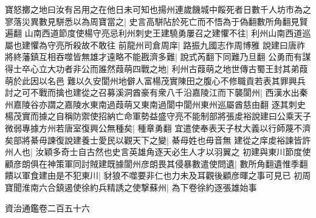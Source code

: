 寶怒擲之地曰汝有呂用之在他日未可知也揚州連歲饑城中餒死者日數千人坊市為之寥落災異數見駢悉以為周寶當之|{
	史言高駢阽於死亡而不悟為于偽翻數所角翻見賢遍翻}
山南西道節度使楊守亮忌利州刺史王建驍勇屢召之建懼不往|{
	利州山南西道巡屬也建懼為守亮所殺故不敢往}
前龍州司倉周庠|{
	路振九國志作周博雅}
說建曰唐祚將終藩鎮互相吞噬皆無雄才遠略不能戡濟多難|{
	說式芮翻下同難乃旦翻}
公勇而有謀得士卒心立大功者非公而誰然葭萌四戰之地|{
	利州古葭萌之地世傳古蜀王封其弟葭萌於此因以名邑}
難以久安閬州地僻人富楊茂實陳田之腹心不修職貢若表其罪興兵討之可不戰而擒也建從之召募溪洞酋豪有衆八千沿嘉陵江而下襲閬州|{
	西漢水出秦州嘉陵谷亦謂之嘉陵水東南過葭萌又東南過閬中閬州東州巡屬酋慈由翻}
逐其刺史楊茂實而據之自稱防禦使招納亡命軍勢益盛守亮不能制部將張䖍裕說建曰公乘天子微弱專據方州若唐室復興公無種矣|{
	種章勇翻}
宜遣使奉表天子杖大義以行師蔑不濟矣部將綦毋諫復說建養士愛民以觀天下之變|{
	綦母姓也毋音無}
建從之庠䖍裕諫皆許州人也|{
	汝穎多奇士自古然也史言英雄角逐天必生人才以羽翼之}
初建與東川節度使顧彦朗俱在神策軍同討賊建既據閬州彦朗畏其侵暴數遣使問遺|{
	數所角翻遺惟季翻}
饋以軍食建由是不犯東川|{
	豺狼不噬要非仁也力未及耳觀後顧彦暉之事可見已}
初周寶聞淮南六合鎮遏使徐約兵精誘之使撃蘇州|{
	為下卷徐約逐張雄始事}


資治通鑑卷二百五十六
